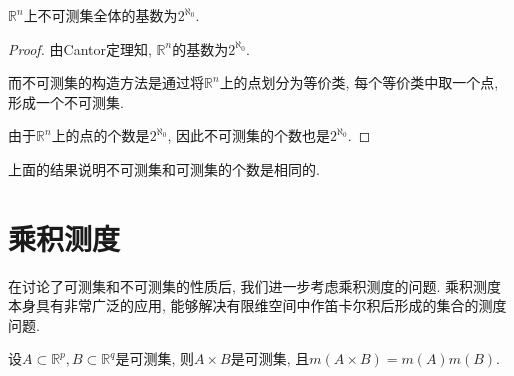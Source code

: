 \documentclass[theorem=false,mathfont=none,openany,sub3section]{easybook}
\begin{document}
\begin{proposition}
  $\mathbb{R}^n$上不可测集全体的基数为$2^{\aleph_0}$.\par
\end{proposition}

\begin{proof}
  由Cantor定理知, $\mathbb{R}^n$的基数为$2^{\aleph_0}$.\par
  而不可测集的构造方法是通过将$\mathbb{R}^n$上的点划分为等价类, 每个等价类中取一个点, 形成一个不可测集.\par
  由于$\mathbb{R}^n$上的点的个数是$2^{\aleph_0}$, 因此不可测集的个数也是$2^{\aleph_0}$.\par
\end{proof}

\begin{remark}
  上面的结果说明不可测集和可测集的个数是相同的.\par
\end{remark}

\newpage

\section{乘积测度}

在讨论了可测集和不可测集的性质后, 我们进一步考虑乘积测度的问题. 乘积测度本身具有非常广泛的应用, 能够解决有限维空间中作笛卡尔积后形成的集合的测度问题.\par

\begin{theorem}
  设$A\subset \mathbb{R}^p, B\subset \mathbb{R}^q$是可测集, 则$A\times B$是可测集, 且$m(A\times B)=m(A)m(B)$.\par
\end{theorem}
\end{document}
